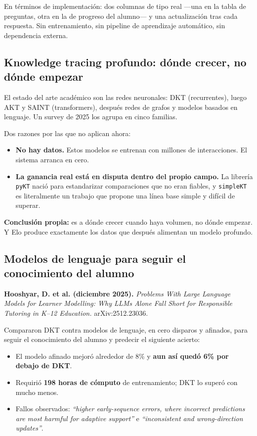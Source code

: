 \documentclass[11pt,a4paper]{article}
\begin{document}
En términos de implementación: dos columnas de tipo real ---una en la tabla de preguntas, otra en la de progreso del alumno--- y una actualización tras cada respuesta. Sin entrenamiento, sin pipeline de aprendizaje automático, sin dependencia externa.

\subsection{Knowledge tracing profundo: dónde crecer, no dónde empezar}

El estado del arte académico son las redes neuronales: DKT (recurrentes), luego AKT y SAINT (transformers), después redes de grafos y modelos basados en lenguaje. Un survey de 2025 los agrupa en cinco familias.

Dos razones por las que no aplican ahora:

\begin{itemize}
\item \textbf{No hay datos.} Estos modelos se entrenan con millones de interacciones. El sistema arranca en cero.
\item \textbf{La ganancia real está en disputa dentro del propio campo.} La librería \texttt{pyKT} nació para estandarizar comparaciones que no eran fiables, y \texttt{simpleKT} es literalmente un trabajo que propone una línea base simple y difícil de superar.
\end{itemize}

\textbf{Conclusión propia:} es a dónde crecer cuando haya volumen, no dónde empezar. Y Elo produce exactamente los datos que después alimentan un modelo profundo.

\subsection{Modelos de lenguaje para seguir el conocimiento del alumno}

\textbf{Hooshyar, D. et al. (diciembre 2025).} \emph{Problems With Large Language Models for Learner Modelling: Why LLMs Alone Fall Short for Responsible Tutoring in K--12 Education.} arXiv:2512.23036.

Compararon DKT contra modelos de lenguaje, en cero disparos y afinados, para seguir el conocimiento del alumno y predecir el siguiente acierto:

\begin{itemize}
\item El modelo afinado mejoró alrededor de 8\% y \textbf{aun así quedó 6\% por debajo de DKT}.
\item Requirió \textbf{198 horas de cómputo} de entrenamiento; DKT lo superó con mucho menos.
\item Fallos observados: \emph{``higher early-sequence errors, where incorrect predictions are most harmful for adaptive support''} e \emph{``inconsistent and wrong-direction updates''}.
\end{itemize}
\end{document}
